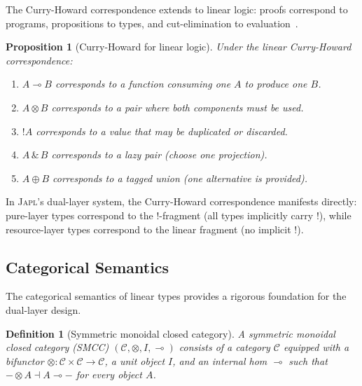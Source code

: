 \documentclass[11pt]{article}
\newtheorem{proposition}[theorem]{Proposition}
\newtheorem{definition}[theorem]{Definition}
\newcommand{\JAPL}{\textsc{Japl}}
\newcommand{\lolli}{\multimap}
\newcommand{\tensor}{\otimes}
\newcommand{\bang}{{\mathop{!}}}
\begin{document}
The Curry-Howard correspondence extends to linear logic: proofs
correspond to programs, propositions to types, and cut-elimination to
evaluation~\cite{girard1987linear,wadler2012propositions}.

\begin{proposition}[Curry-Howard for linear logic]\label{prop:curry-howard}
Under the linear Curry-Howard correspondence:
\begin{enumerate}[label=(\roman*)]
  \item $A \lolli B$ corresponds to a function consuming one $A$ to produce one $B$.
  \item $A \tensor B$ corresponds to a pair where both components must be used.
  \item $\bang A$ corresponds to a value that may be duplicated or discarded.
  \item $A \,\&\, B$ corresponds to a lazy pair (choose one projection).
  \item $A \oplus B$ corresponds to a tagged union (one alternative is provided).
\end{enumerate}
\end{proposition}

In \JAPL{}'s dual-layer system, the Curry-Howard correspondence
manifests directly: pure-layer types correspond to the
$\bang$-fragment (all types implicitly carry $\bang$), while
resource-layer types correspond to the linear fragment (no implicit
$\bang$).

\subsection{Categorical Semantics}\label{sec:categorical}

The categorical semantics of linear types provides a rigorous
foundation for the dual-layer design.

\begin{definition}[Symmetric monoidal closed category]\label{def:smcc}
A \emph{symmetric monoidal closed category} (SMCC)
$(\mathcal{C}, \tensor, I, \lolli)$ consists of a category $\mathcal{C}$
equipped with a bifunctor $\tensor : \mathcal{C} \times \mathcal{C}
\to \mathcal{C}$, a unit object $I$, and an internal hom
$\lolli$ such that $- \tensor A \dashv A \lolli -$ for every object
$A$.
\end{definition}
\end{document}
